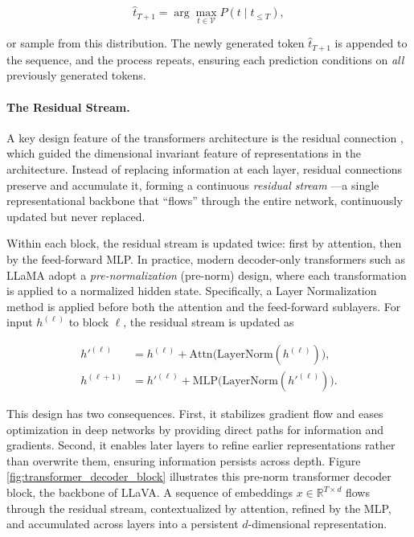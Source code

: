 \begin{equation*}
\hat{t}_{T+1} = \arg\max_{t \in \mathcal{V}} P(t \mid t_{\leq T}),
\end{equation*}

or sample from this distribution. The newly generated token $\hat{t}_{T+1}$ is appended to the sequence, and the process repeats, ensuring each prediction conditions on \emph{all} previously generated tokens.

\paragraph{The Residual Stream.}

A key design feature of the transformers architecture is the residual connection \cite{heDeepResidualLearning2015}, which guided the dimensional invariant feature of representations in the architecture. Instead of replacing information at each layer, residual connections preserve and accumulate it, forming  a continuous \textit{residual stream} \cite{elhage2021mathematical}---a single representational backbone that ``flows'' through the entire network, continuously updated but never replaced.

Within each block, the residual stream is updated twice: first by attention, then by the feed-forward MLP. In practice, modern decoder-only transformers such as LLaMA \cite{touvronLLaMAOpenEfficient2023} adopt a \textit{pre-normalization} (pre-norm) design, where each transformation is applied to a normalized hidden state. Specifically, a Layer Normalization \cite{baLayerNormalization2016, zhangRootMeanSquare2019} method is applied before both the attention and the feed-forward sublayers. For input $h^{(\ell)}$ to block $\ell$, the residual stream is updated as

\begin{align*}
h'^{(\ell)} &= h^{(\ell)} + \text{Attn}\!\big(\text{LayerNorm}(h^{(\ell)})\big), \\
h^{(\ell+1)} &= h'^{(\ell)} + \text{MLP}\!\big(\text{LayerNorm}(h'^{(\ell)})\big).
\end{align*}

This design has two consequences. First, it stabilizes gradient flow and eases optimization in deep networks by providing direct paths for information and gradients. Second, it enables later layers to refine earlier representations rather than overwrite them, ensuring information persists across depth. Figure \ref{fig:transformer_decoder_block} illustrates this pre-norm transformer decoder block, the backbone of LLaVA. A sequence of embeddings $x \in \mathbb{R}^{T \times d}$ flows through the residual stream, contextualized by attention, refined by the MLP, and accumulated across layers into a persistent $d$-dimensional representation.

